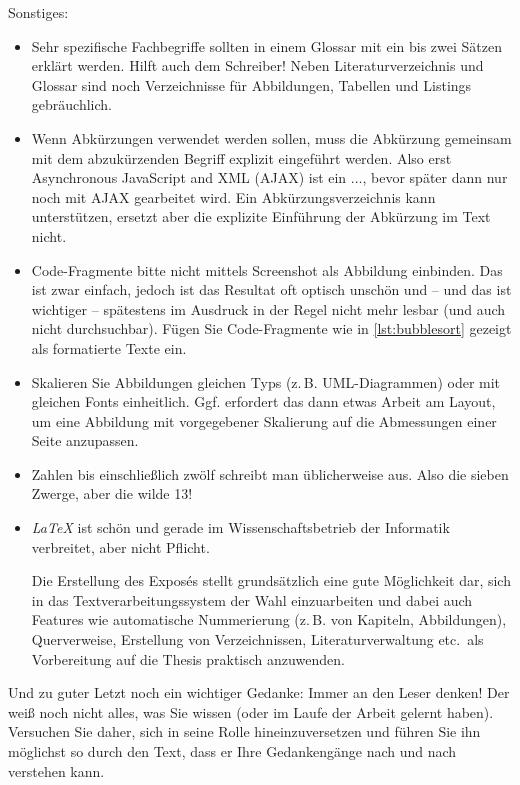 \documentclass[11pt]{scrartcl}
\newcommand{\qto}[1]{\glqq #1\grqq}				%
\newcommand{\zB}{\mbox{z.\,B.}\xspace}
\begin{document}
\noindent
Sonstiges:
\begin{itemize}
	\item Sehr spezifische Fachbegriffe sollten in einem Glossar mit ein bis zwei Sätzen erklärt werden. Hilft auch dem Schreiber! Neben Literaturverzeichnis und Glossar sind noch Verzeichnisse für Abbildungen, Tabellen und Listings gebräuchlich.
	\item Wenn Abkürzungen verwendet werden sollen, muss die Abkürzung gemeinsam mit dem abzukürzenden Begriff explizit eingeführt werden. Also erst \qto{Asynchronous JavaScript and XML (AJAX) ist ein ...}, bevor später dann nur noch mit \qto{AJAX} gearbeitet wird. Ein Abkürzungsverzeichnis kann unterstützen, ersetzt aber die explizite Einführung der Abkürzung im Text nicht.
 	\item Code-Fragmente bitte nicht mittels Screenshot als Abbildung einbinden. Das ist zwar einfach, jedoch ist das Resultat oft optisch unschön und -- und das ist wichtiger -- spätestens im Ausdruck in der Regel nicht mehr lesbar (und auch nicht durchsuchbar). Fügen Sie Code-Fragmente wie in \cref{lst:bubblesort} gezeigt als 
 	formatierte Texte ein.
	\item Skalieren Sie Abbildungen gleichen Typs (\zB UML-Diagrammen) oder mit gleichen Fonts einheitlich. Ggf.{\xspace} erfordert das dann etwas Arbeit am Layout, um eine Abbildung mit vorgegebener Skalierung auf die Abmessungen einer Seite anzupassen.
 	\item Zahlen bis einschließlich zwölf schreibt man üblicherweise aus. Also \qto{die sieben Zwerge}, aber \qto{die wilde 13}!
	\item \emph{LaTeX} \cite{lit:Schlosser:WissArbeitenMitLatex} ist schön und gerade im Wissenschaftsbetrieb der Informatik verbreitet, aber nicht Pflicht. 
	
	Die Erstellung des Exposés stellt grundsätzlich eine gute Möglichkeit dar, sich in das Textverarbeitungssystem der Wahl einzuarbeiten und dabei auch Features wie automatische Nummerierung (\zB von Kapiteln, Abbildungen), Querverweise, Erstellung von Verzeichnissen, Literaturverwaltung etc.\ als Vorbereitung auf die Thesis praktisch anzuwenden.
\end{itemize}



\noindent
Und zu guter Letzt noch ein wichtiger Gedanke: Immer an den Leser denken! Der weiß noch nicht alles, was Sie wissen (oder im Laufe der Arbeit gelernt haben). Versuchen Sie daher, sich in seine Rolle hineinzuversetzen und führen Sie ihn möglichst so durch den Text, dass er Ihre Gedankengänge nach und nach verstehen kann. 
\end{document}
